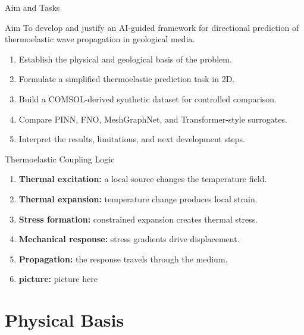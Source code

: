 \documentclass[aspectratio=169,10pt]{beamer}
\begin{document}
\begin{frame}{Aim and Tasks}
  \begin{block}{Aim}
    To develop and justify an AI-guided framework for directional
    prediction of thermoelastic wave propagation in geological media.
  \end{block}
  \vskip 4pt
  \begin{enumerate}
    \item Establish the physical and geological basis of the problem.
    \item Formulate a simplified thermoelastic prediction task in 2D.
    \item Build a COMSOL-derived synthetic dataset for controlled comparison.
    \item Compare PINN, FNO, MeshGraphNet, and Transformer-style surrogates.
    \item Interpret the results, limitations, and next development steps.
  \end{enumerate}
\end{frame}

\begin{frame}{Thermoelastic Coupling Logic}
  \begin{enumerate}
    \item \textbf{Thermal excitation:} a local source changes the temperature field.
    \item \textbf{Thermal expansion:} temperature change produces local strain.
    \item \textbf{Stress formation:} constrained expansion creates thermal stress.
    \item \textbf{Mechanical response:} stress gradients drive displacement.
    \item \textbf{Propagation:} the response travels through the medium.
    \item \textbf{picture:} picture here
  \end{enumerate}
\end{frame}

\section{Physical Basis}
\end{document}
